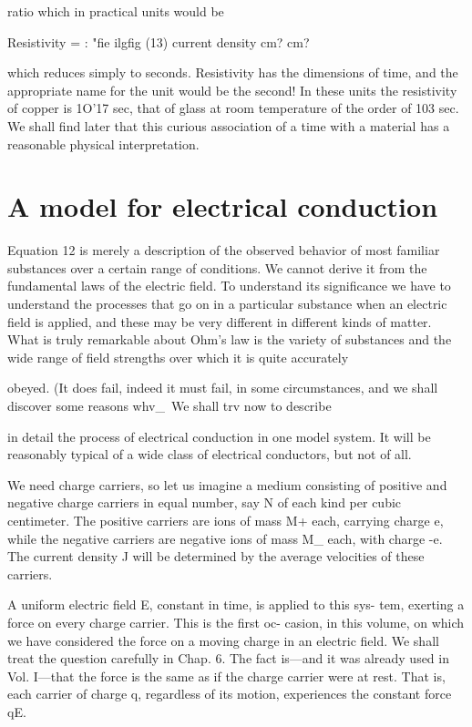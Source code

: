 ratio which in practical units would be

Resistivity =  : "fie ilgfig (13)
current density cm? cm?
\begin{equation}
\end{equation}

which reduces simply to seconds. Resistivity has the dimensions of
time, and the appropriate name for the unit would be the second!
In these units the resistivity of copper is 1O'17 sec, that of glass at
room temperature of the order of 103 sec. We shall find later that
this curious association of a time with a material has a reasonable
physical interpretation.

\section{A model for electrical conduction}

Equation 12 is merely a description of the observed behavior of
most familiar substances over a certain range of conditions. We
cannot derive it from the fundamental laws of the electric field. To
understand its significance we have to understand the processes that
go on in a particular substance when an electric field is applied, and
these may be very different in different kinds of matter. What is
truly remarkable about Ohm's law is the variety of substances and
the wide range of field strengths over which it is quite accurately

obeyed. (It does fail, indeed it must fail, in some circumstances, and
we shall discover some reasons whv_\ We shall trv now to describe

in detail the process of electrical conduction in one model system.
It will be reasonably typical of a wide class of electrical conductors,
but not of all.

We need charge carriers, so let us imagine a medium consisting of
positive and negative charge carriers in equal number, say N of each
kind per cubic centimeter. The positive carriers are ions of mass M+
each, carrying charge e, while the negative carriers are negative ions
of mass M_ each, with charge -e. The current density J will be
determined by the average velocities of these carriers.

A uniform electric field E, constant in time, is applied to this sys-
tem, exerting a force on every charge carrier. This is the first oc-
casion, in this volume, on which we have considered the force on a
moving charge in an electric field. We shall treat the question carefully
in Chap. 6. The fact is---and it was already used in Vol. I---that
the force is the same as if the charge carrier were at rest. That is,
each carrier of charge q, regardless of its motion, experiences the
constant force qE.

